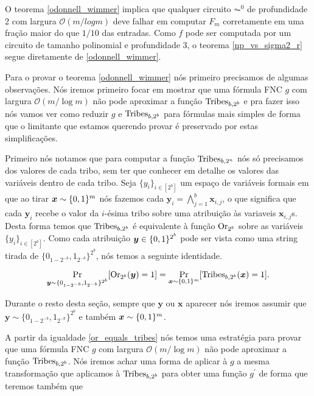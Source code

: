O teorema \ref{odonnell_wimmer} implica que qualquer circuito $\AC^{0}$ de profundidade 2 com largura $\mathcal{O}(m/logm)$ deve falhar em computar $F_{m}$ corretamente em uma fração maior do que $1/10$ das entradas. Como $f$ pode ser computada por um circuito de tamanho polinomial e profundidade 3, o teorema \ref{np_vs_sigma2_r} segue diretamente de \ref{odonnell_wimmer}.

Para o provar o teorema \ref{odonnell_wimmer} nós primeiro precisamos de algumas observações. Nós iremos primeiro focar em mostrar que uma fórmula FNC $g$ com largura $\mathcal{O}(m/\log m)$ não pode aproximar a função $\text{Tribes}_{b, 2^{b}}$ e pra fazer isso nós vamos ver como reduzir $g$ e $\text{Tribes}_{b, 2^{b}}$ para fórmulas mais simples de forma que o limitante que estamos querendo provar é preservado por estas simplificações.

Primeiro nós notamos que para computar a função $\text{Tribes}_{b, 2^{n}}$ nós só precisamos dos valores de cada tribo, sem ter que conhecer em detalhe os valores das variáveis dentro de cada tribo. Seja $\{y_{i}\}_{i \in [2^{b}]}$ um espaço de variáveis formais em que ao tirar $\boldsymbol{x} \sim \{0, 1\}^{m}$ nós fazemos cada $\boldsymbol{y}_{i} = \bigwedge_{j = 1}^{b} \boldsymbol{x}_{i, j}$, o que significa que cada $\boldsymbol{y}_{i}$ recebe o valor da $i$-ésima tribo sobre uma atribuição às variaveis $\boldsymbol{x}_{i, j}$s. Desta forma temos que $\text{Tribes}_{b, 2^{b}}$ é equivalente à função $\text{Or}_{2^{b}}$ sobre as variáveis $\{y_{i}\}_{i \in [2^{b}]}$. Como cada atribuição $\boldsymbol{y} \in \{0, 1\}^{2^{b}}$ pode ser vista como uma string tirada de $\{0_{1 - 2^{-b}}, 1_{2^{-b}}\}^{2^{b}}$, nós temos a seguinte identidade.

\begin{equation} \label{or_equals_tribes}
    \Pr_{\boldsymbol{y} \sim \{0_{1 - 2^{-b}}, 1_{2^{-b}}\}^{2^{b}}} [\text{Or}_{2^{b}}(\boldsymbol{y}) = 1] = \Pr_{\boldsymbol{x} \sim \{0, 1\}^{m}}[\text{Tribes}_{b, 2^{b}}(\boldsymbol{x}) = 1].
\end{equation}

Durante o resto desta seção, sempre que $\boldsymbol{y}$ ou $\boldsymbol{x}$ aparecer nós iremos assumir que $\boldsymbol{y} \sim \{0_{1 - 2^{-b}}, 1_{2^{-b}}\}^{2^{b}}$ e também $\boldsymbol{x} \sim \{0, 1\}^{m}$.

A partir da igualdade \ref{or_equals_tribes} nós temos uma estratégia para provar que uma fórmula FNC $g$ com largura $\mathcal{O}(m/\log m)$ não pode aproximar a função $\text{Tribes}_{b, 2^{b}}$. Nós iremos achar uma forma de aplicar à $g$ a mesma transformação que aplicamos à $\text{Tribes}_{b, 2^{b}}$ para obter uma função $g^{\prime}$ de forma que teremos também que


